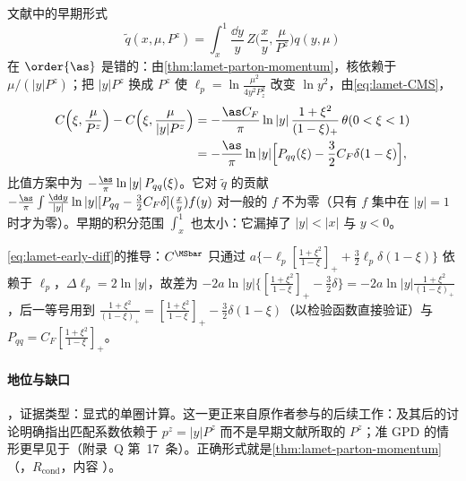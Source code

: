\begin{remark}\label{rem:lamet-early-form}
文献\cite[式~(11)]{Ji2013}中的早期形式
\[
\tilde q(x,\mu,P^z)=\int_x^1\frac{\dd y}y\,Z\Big(\frac xy,\frac\mu{P^z}\Big)q(y,\mu)
\]
在 $\order{\as}$ 是错的：由\cref{thm:lamet-parton-momentum}，核依赖于 $\mu/(|y|P^z)$；把 $|y|P^z$ 换成 $P^z$ 使 $\ell_p=\ln\frac{\mu^2}{4y^2P_z^2}$ 改变 $\ln y^2$，由\cref{eq:lamet-CMS}，
\begin{equation}\label{eq:lamet-early-diff}
\begin{split}
C\Big(\xi,\frac\mu{P^z}\Big)-C\Big(\xi,\frac\mu{|y|P^z}\Big)&=-\frac{\as C_F}\pi\ln|y|\,\frac{1+\xi^2}{(1-\xi)_+}\,\theta(0<\xi<1)\\
&=-\frac{\as}\pi\ln|y|\Big[P_{qq}(\xi)-\frac32C_F\delta(1-\xi)\Big],
\end{split}
\end{equation}%
比值方案中为 $-\frac{\as}\pi\ln|y|\,P_{qq}(\xi)$。它对 $\tilde q$ 的贡献 $-\frac{\as}\pi\int\frac{\dd y}{|y|}\ln|y|[P_{qq}-\frac32C_F\delta](\frac xy)f(y)$ 对一般的 $f$ 不为零（只有 $f$ 集中在 $|y|=1$ 时才为零）。早期的积分范围 $\int_x^1$ 也太小：它漏掉了 $|y|<|x|$ 与 $y<0$。
\end{remark}

\cref{eq:lamet-early-diff}的推导：$C^{\MSbar}$ 只通过 $a\{-\ell_p[\frac{1+\xi^2}{1-\xi}]_++\frac32\ell_p\delta(1-\xi)\}$ 依赖于 $\ell_p$，$\Delta\ell_p=2\ln|y|$，故差为 $-2a\ln|y|\{[\frac{1+\xi^2}{1-\xi}]_+-\frac32\delta\}=-2a\ln|y|\frac{1+\xi^2}{(1-\xi)_+}$，后一等号用到 $\frac{1+\xi^2}{(1-\xi)_+}=[\frac{1+\xi^2}{1-\xi}]_+-\frac32\delta(1-\xi)$（以检验函数直接验证）与 $P_{qq}=C_F[\frac{1+\xi^2}{1-\xi}]_+$。

\paragraph{地位与缺口}
\tagV，证据类型：显式的单圈计算\cite{IzubuchiEtAl2018}。这一更正来自原作者参与的后续工作：\cite[式~(27)]{IzubuchiEtAl2018}及其后的讨论明确指出匹配系数依赖于 $p^z=|y|P^z$ 而不是早期文献所取的 $P^z$；准 GPD 的情形更早见于\cite{Ji:2015qla}（附录~Q 第~17~条）。正确形式就是\cref{thm:lamet-parton-momentum}（\tagR，$R_{\mathrm{cond}}$，内容 \tagA）。

